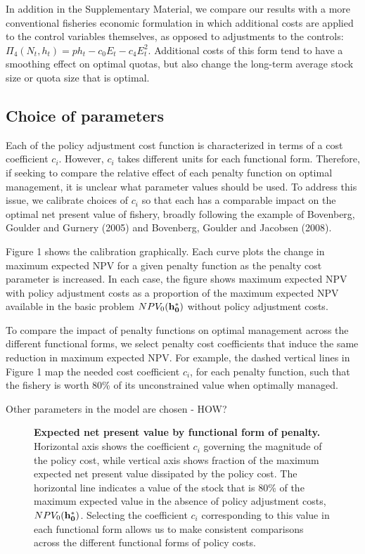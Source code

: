 \documentclass[12pt]{article}
\begin{document}
In addition in the Supplementary Material, we compare our results with a more conventional fisheries economic formulation in which additional costs are applied to the control variables themselves, as opposed to adjustments to the controls: $ \Pi_4 (N_t,h_t) = p h_t -  c_0 E_t-c_4E_t^2$. Additional costs of this form tend to have  a smoothing effect on optimal quotas, but also change the long-term average stock size or quota size that is optimal.

\subsection*{Choice of parameters}

Each of the policy adjustment cost function is characterized in terms
of a cost coefficient $c_i$.  However, $c_i$ takes different units for each  functional form. Therefore, if seeking to compare the relative effect of each penalty function on optimal management, it is unclear what parameter values should be used. To address this issue, we calibrate choices of $c_i$ so that each has a comparable impact on the optimal net present value of fishery, broadly following the example of Bovenberg, Goulder and Gurnery (2005) and Bovenberg, Goulder and Jacobsen (2008).

Figure 1 shows the calibration graphically.  Each curve plots the change in maximum expected NPV for a given penalty function as the penalty cost parameter is increased. In each case, the figure shows maximum expected NPV with policy adjustment costs as a proportion of the maximum expected NPV available in the basic problem $NPV_0({\bf h_0^*})$ without policy adjustment costs. 

To compare the impact of penalty functions on optimal management across the different functional forms, we select penalty cost coefficients that induce the same reduction in maximum expected NPV. For example, the dashed vertical lines in Figure 1 map the needed cost coefficient $c_i$, for each penalty function, such that the fishery is worth 80\% of its unconstrained value when optimally managed. 

Other parameters in the model are chosen - HOW? 

\begin{figure}
\caption{\textbf{Expected net present value by functional form of penalty.} Horizontal axis shows the coefficient $c_i$ governing the magnitude of the policy cost, while vertical axis shows fraction of the maximum expected net present value dissipated by the policy cost.  The horizontal line indicates a value of the stock that is 80\% of the maximum expected value in the absence of policy adjustment costs, $NPV_0({\bf h_0^*})$. Selecting the coefficient $c_i$ corresponding to this value in each functional form allows us to make consistent comparisons across the different functional forms of policy costs.  }
\end{figure}
\end{document}

